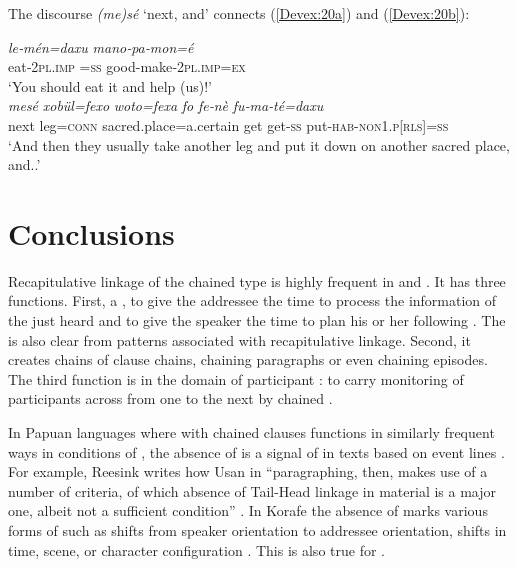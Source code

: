 \documentclass[output=paper]{LSP/langsci}
\begin{document}
The discourse  \textit{(me)sé} `next, and' connects (\ref{Devex:20a}) and (\ref{Devex:20b}):

\begin{exe}
\ex \label{Devex:20ab}
\begin{xlist}
\ex \label{Devex:20a}			     
\gll \textit{le‑mén=daxu} \textit{mano‑pa‑mon=é}\\
eat‑\textsc{2pl.imp =ss}	good-make‑\textsc{2pl.imp=ex}\\
\glt `You should  eat it and help (us)!'\\
	
\ex \label{Devex:20b}			     
\gll \textit{mesé} \textit{xobül=fexo} \textit{woto=fexa} \textit{fo} \textit{fe‑nè} \textit{fu‑ma‑té=daxu}\\
next leg=\textsc{conn} sacred.place=a.certain get get‑\textsc{ss} put‑\textsc{hab-non1.p[rls]=ss}\\
\glt `And then they usually take another leg and put it down on another sacred place, and..'\\
\end{xlist}
\end{exe}

\section{Conclusions} 
\label{DevConclusions}
Recapitulative linkage of the chained type is highly frequent in   and . It has three functions. First, a , to give the addressee the time to process the information of  the  just heard and to give the speaker the time to plan his or her following . The  is also clear from  patterns associated with recapitulative linkage.  Second, it creates chains of clause chains, chaining paragraphs or even chaining episodes.  The third function  is in the domain of participant : to carry   monitoring of participants across from one  to the next by chained .  

In Papuan languages where  with chained clauses functions in similarly frequent ways in conditions of , the absence of  is a signal of  in texts based on  event lines \citep[][375]{devries.2005}.  For example, Reesink writes how Usan in ``paragraphing, then, makes use of a number of criteria, of which absence of Tail-Head linkage in  material is a major one, albeit not a sufficient condition'' \citep[][332]{reesink87}. In Korafe the absence of  marks various forms of  such as shifts from speaker orientation to addressee orientation, shifts in time, scene, or character configuration \citep[][337, 363]{farr99}. This is also true for . 
\end{document}

